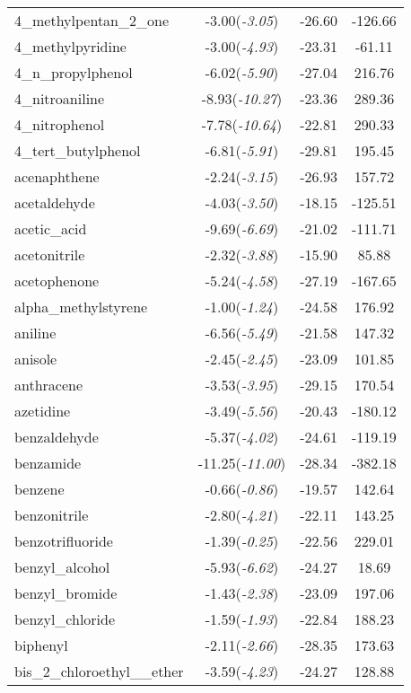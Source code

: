 \documentclass{amsart}
\begin{document}
\begin{center}
\begin{longtable}{l|c|c|c}
4\_methylpentan\_2\_one & -3.00(\textit{-3.05}) & -26.60 & -126.66 \\ 
4\_methylpyridine & -3.00(\textit{-4.93}) & -23.31 & -61.11 \\ 
4\_n\_propylphenol & -6.02(\textit{-5.90}) & -27.04 & 216.76 \\ 
4\_nitroaniline & -8.93(\textit{-10.27}) & -23.36 & 289.36 \\ 
4\_nitrophenol & -7.78(\textit{-10.64}) & -22.81 & 290.33 \\ 
4\_tert\_butylphenol & -6.81(\textit{-5.91}) & -29.81 & 195.45 \\ 
acenaphthene & -2.24(\textit{-3.15}) & -26.93 & 157.72 \\ 
acetaldehyde & -4.03(\textit{-3.50}) & -18.15 & -125.51 \\ 
acetic\_acid & -9.69(\textit{-6.69}) & -21.02 & -111.71 \\ 
acetonitrile & -2.32(\textit{-3.88}) & -15.90 & 85.88 \\ 
acetophenone & -5.24(\textit{-4.58}) & -27.19 & -167.65 \\ 
alpha\_methylstyrene & -1.00(\textit{-1.24}) & -24.58 & 176.92 \\ 
aniline & -6.56(\textit{-5.49}) & -21.58 & 147.32 \\ 
anisole & -2.45(\textit{-2.45}) & -23.09 & 101.85 \\ 
anthracene & -3.53(\textit{-3.95}) & -29.15 & 170.54 \\ 
azetidine & -3.49(\textit{-5.56}) & -20.43 & -180.12 \\ 
benzaldehyde & -5.37(\textit{-4.02}) & -24.61 & -119.19 \\ 
benzamide & -11.25(\textit{-11.00}) & -28.34 & -382.18 \\ 
benzene & -0.66(\textit{-0.86}) & -19.57 & 142.64 \\ 
benzonitrile & -2.80(\textit{-4.21}) & -22.11 & 143.25 \\ 
benzotrifluoride & -1.39(\textit{-0.25}) & -22.56 & 229.01 \\ 
benzyl\_alcohol & -5.93(\textit{-6.62}) & -24.27 & 18.69 \\ 
benzyl\_bromide & -1.43(\textit{-2.38}) & -23.09 & 197.06 \\ 
benzyl\_chloride & -1.59(\textit{-1.93}) & -22.84 & 188.23 \\ 
biphenyl & -2.11(\textit{-2.66}) & -28.35 & 173.63 \\ 
bis\_2\_chloroethyl\_\_ether & -3.59(\textit{-4.23}) & -24.27 & 128.88 \\ 

\end{longtable}
\end{center}
\end{document}
